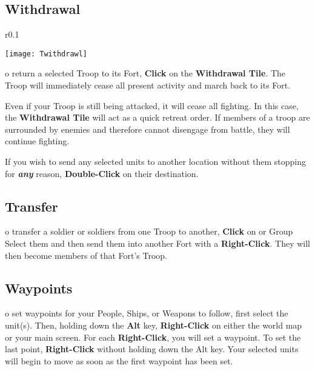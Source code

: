 \subsection{\textsf{Withdrawal}}


\begin{wrapfigure}{r}{0.1\textwidth}
    \vspace{-20pt}
    \begin{center}
        \texttt{[image: Twithdrawl]}
    \end{center}
    \vspace{-20pt}
\end{wrapfigure}

o return a selected Troop to its Fort, \textbf{Click} on the \textbf{Withdrawal Tile}. The Troop will immediately cease all present activity and march back to its Fort.

Even if your Troop is still being attacked, it will cease all fighting. In this case, the \textbf{Withdrawal Tile} will act as a quick retreat order. If members of a troop are surrounded by enemies and therefore cannot disengage from battle, they will continue fighting.

If you wish to send any selected units to another location without them stopping for \textbf{\textit{any}} reason, \textbf{Double-Click} on their destination.

\subsection{\textsf{Transfer}}


o transfer a soldier or soldiers from one Troop to another, \textbf{Click} on or Group Select them and then send them into another Fort with a \textbf{Right-Click}. They will then become members of that Fort’s Troop.

\subsection{\textsf{Waypoints}}


o set waypoints for your People, Ships, or Weapons to follow, first select the unit(s). Then, holding down the \textbf{Alt} key, \textbf{Right-Click} on either the world map or your main screen. For each \textbf{Right-Click}, you will set a waypoint. To set the last point, \textbf{Right-Click} without holding down the Alt key. Your selected units will begin to move as soon as the first waypoint has been set.

